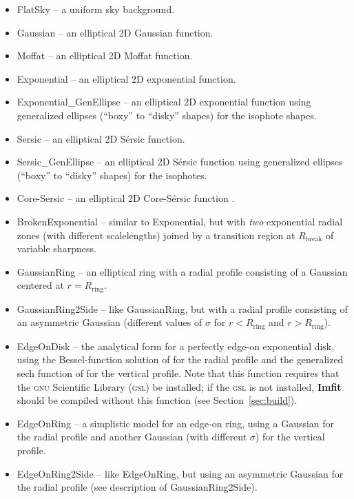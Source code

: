 \documentclass[10pt,a4paper,article]{memoir}
\newcommand{\imfit}{\textbf{Imfit}}
\begin{document}
\begin{itemize}
\item FlatSky -- a uniform sky background.
\item Gaussian -- an elliptical 2D Gaussian function.
\item Moffat -- an elliptical 2D Moffat function.
\item Exponential -- an elliptical 2D exponential function.
\item Exponential\_GenEllipse -- an elliptical 2D exponential function using
generalized ellipses (``boxy'' to ``disky'' shapes) for the isophote shapes.
\item Sersic -- an elliptical 2D S\'ersic function.
\item Sersic\_GenEllipse -- an elliptical 2D S\'ersic function using
generalized ellipses (``boxy'' to ``disky'' shapes) for the isophotes.
\item Core-Sersic -- an elliptical 2D Core-S\'ersic function \citep{graham03,trujillo04}.
\item BrokenExponential -- similar to Exponential, but with \textit{two}
exponential radial zones (with different scalelengths) joined by a transition region
at $R_{\mathrm{break}}$ of variable sharpness.
\item GaussianRing -- an elliptical ring with a radial profile
consisting of a Gaussian centered at $r = R_{\mathrm{ring}}$.
\item GaussianRing2Side -- like GaussianRing, but with a radial profile
consisting of an asymmetric Gaussian (different values of $\sigma$ for
$r < R_{\mathrm{ring}}$ and $r > R_{\mathrm{ring}}$).
\item EdgeOnDisk -- the analytical form for a perfectly edge-on exponential
disk, using the Bessel-function solution of \citet{vdk81} for 
the radial profile and the generalized sech function of \citet{vdk88} 
for the vertical profile. Note that this function requires that the \textsc{gnu}
Scientific Library (\textsc{gsl}) be installed; if the \textsc{gsl} is not installed, \imfit{}
should be compiled without this function (see Section~\ref{sec:build}).
\item EdgeOnRing -- a simplistic model for an edge-on ring, using a
Gaussian for the radial profile and another Gaussian (with
different $\sigma$) for the vertical profile.
\item EdgeOnRing2Side -- like EdgeOnRing, but using an
asymmetric Gaussian for the radial profile (see description of GaussianRing2Side).

\end{itemize}
\end{document}
